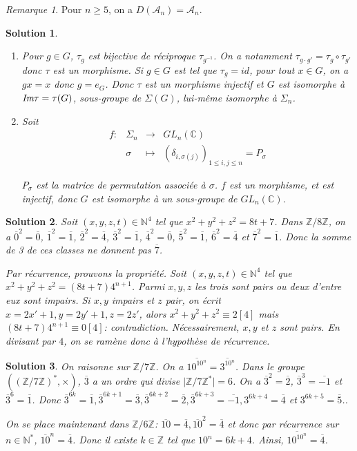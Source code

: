 \documentclass[12pt]{article}
\newtheorem{solution}{Solution}[section]
\theoremstyle{remark}
\newtheorem{remark}{Remarque}[section]
\newcommand{\C}{\mathbb{C}} \newcommand{\Q}{\mathbb{Q}}
\newcommand{\N}{\mathbb{N}} \newcommand{\Z}{\mathbb{Z}}
\newcommand{\function}[5]{
	$$
	\begin{array}{rccl}
		#1: & #2 & \to & #3 \\
		& #4 & \mapsto & #5
	\end{array}
	$$
}
\numberwithin{equation}{section}
\begin{document}
\begin{remark}
	Pour $n\geqslant5$, on a $D(\mathcal{A}_{n})=\mathcal{A}_{n}$.
\end{remark}

\begin{solution}
	\phantom{}
	\begin{enumerate}
		\item Pour $g\in G$, $\tau_{g}$ est bijective de réciproque $\tau_{g^{-1}}$. On a notamment $\tau_{g\cdot g'}=\tau_{g}\circ\tau_{g'}$ donc $\tau$ est un morphisme. Si $g\in G$ est tel que $\tau_{g}=id$, pour tout $x\in G$, on a $gx=x$ donc $g=e_{G}$. Donc $\tau$ est un morphisme injectif et $G$ est isomorphe à $\emph{Im}\tau=\tau(G)$, sous-groupe de $\Sigma(G)$, lui-même isomorphe à $\Sigma_{n}$.
		
		\item Soit \function{f}{\Sigma_{n}}{GL_{n}(\C)}{\sigma}{(\delta_{i,\sigma(j)})_{1\leqslant i,j\leqslant n}=P_{\sigma}}
		$P_{\sigma}$ est la matrice de permutation associée à $\sigma$. $f$ est un morphisme, et est injectif, donc $G$ est isomorphe à un sous-groupe de $GL_{n}(\C)$.
	\end{enumerate}
\end{solution}

\begin{solution}
	Soit $(x,y,z,t)\in\N^{4}$ tel que $x^{2}+y^{2}+z^{2}=8t+7$. Dans $\Z/8\Z$, on a $\overline{0}^{2}=\overline{0}$, $\overline{1}^{2}=\overline{1}$, $\overline{2}^{2}=\overline{4}$, $\overline{3}^{2}=\overline{1}$, $\overline{4}^{2}=\overline{0}$, $\overline{5}^{2}=\overline{1}$, $\overline{6}^{2}=\overline{4}$ et $\overline{7}^{2}=\overline{1}$. Donc la somme de 3 de ces classes ne donnent pas $\overline{7}$.

	Par récurrence, prouvons la propriété. Soit $(x,y,z,t)\in\N^{4}$ tel que $x^{2}+y^{2}+z^{2}=(8t+7)4^{n+1}$. Parmi $x,y,z$ les trois sont pairs ou deux d'entre eux sont impairs. Si $x,y$ impairs et $z$ pair, on écrit $x=2x'+1,y=2y'+1,z=2z'$, alors $x^{2}+y^{2}+z^{2}\equiv 2[4]$ mais $(8t+7)4^{n+1}\equiv 0[4]$: contradiction. Nécessairement, $x,y$ et $z$ sont pairs. En divisant par $4$, on se ramène donc à l'hypothèse de récurrence.
\end{solution}

\begin{solution}
	On raisonne sur $\Z/7\Z$. On a $\overline{10^{10^{n}}}=\overline{3^{10^{n}}}$. Dans le groupe $((\Z/7\Z)^{*},\times)$, $\overline{3}$ a un ordre qui divise $\vert \Z/7\Z^{*}\vert=6$. On a $\overline{3}^{2}=\overline{2}$, $\overline{3}^{3}=\overline{-1}$ et $\overline{3}^{6}=\overline{1}$. Donc $\overline{3}^{6k}=\overline{1}, \overline{3}^{6k+1}=\overline{3},\overline{3}^{6k+2}=\overline{2},\overline{3}^{6k+3}=\overline{-1}, 3^{6k+4}=\overline{4}$ et $3^{6k+5}=\overline{5}$..

	On se place maintenant dans $\Z/6\Z$: $\overline{10}=\overline{4},\overline{10}^{2}=\overline{4}$ et donc par récurrence sur $n\in\N^{*}$, $\overline{10}^{n}=\overline{4}$. Donc il existe $k\in\Z$ tel que $10^{n}=6k+4$. Ainsi, $\overline{10^{10^{n}}}=\overline{4}$.
\end{solution}
\end{document}
